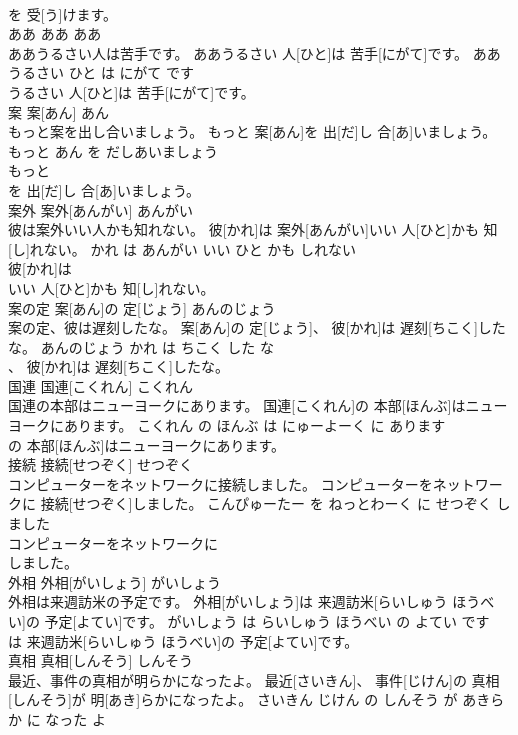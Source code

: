 \documentclass[8pt]{extreport}
\begin{document}
\begin{CJK}{UTF8}{min}
\\	を 受[う]けます。			
\\	ああ	ああ	ああ	
\\	ああうるさい人は苦手です。	ああうるさい 人[ひと]は 苦手[にがて]です。	ああ うるさい ひと は にがて です	
\\	うるさい 人[ひと]は 苦手[にがて]です。			
\\	案	案[あん]	あん	
\\	もっと案を出し合いましょう。	もっと 案[あん]を 出[だ]し 合[あ]いましょう。	もっと あん を だしあいましょう	
\\	もっと
\\	を 出[だ]し 合[あ]いましょう。			
\\	案外	案外[あんがい]	あんがい	
\\	彼は案外いい人かも知れない。	彼[かれ]は 案外[あんがい]いい 人[ひと]かも 知[し]れない。	かれ は あんがい いい ひと かも しれない	
\\	彼[かれ]は
\\	いい 人[ひと]かも 知[し]れない。			
\\	案の定	案[あん]の 定[じょう]	あんのじょう	
\\	案の定、彼は遅刻したな。	案[あん]の 定[じょう]、 彼[かれ]は 遅刻[ちこく]したな。	あんのじょう かれ は ちこく した な	
\\	、 彼[かれ]は 遅刻[ちこく]したな。			
\\	国連	国連[こくれん]	こくれん	
\\	国連の本部はニューヨークにあります。	国連[こくれん]の 本部[ほんぶ]はニューヨークにあります。	こくれん の ほんぶ は にゅーよーく に あります	
\\	の 本部[ほんぶ]はニューヨークにあります。			
\\	接続	接続[せつぞく]	せつぞく	
\\	コンピューターをネットワークに接続しました。	コンピューターをネットワークに 接続[せつぞく]しました。	こんぴゅーたー を ねっとわーく に せつぞく しました	
\\	コンピューターをネットワークに
\\	しました。			
\\	外相	外相[がいしょう]	がいしょう	
\\	外相は来週訪米の予定です。	外相[がいしょう]は 来週訪米[らいしゅう ほうべい]の 予定[よてい]です。	がいしょう は らいしゅう ほうべい の よてい です	
\\	は 来週訪米[らいしゅう ほうべい]の 予定[よてい]です。			
\\	真相	真相[しんそう]	しんそう	
\\	最近、事件の真相が明らかになったよ。	最近[さいきん]、 事件[じけん]の 真相[しんそう]が 明[あき]らかになったよ。	さいきん じけん の しんそう が あきらか に なった よ	

\end{CJK}
\end{document}
